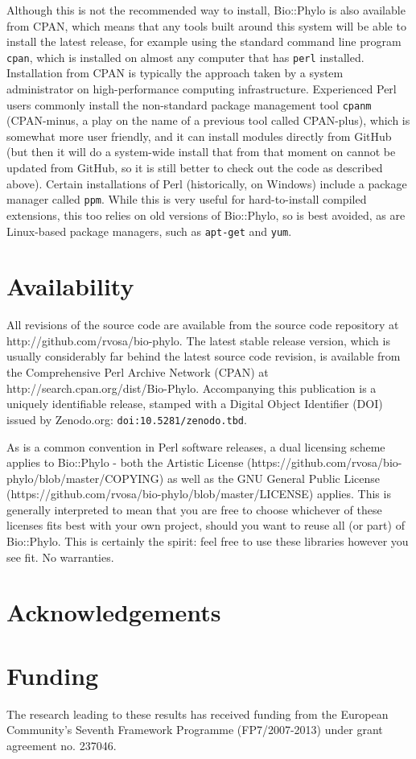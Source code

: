 \documentclass{bioinfo}
\begin{document}
Although this is not the recommended way to install, Bio::Phylo is also available from 
CPAN, which means that any tools built around this system will be able to install the 
latest release, for example using the standard command line program \texttt{cpan}, which 
is installed on almost any computer that has \texttt{perl} installed. Installation from 
CPAN is typically the approach taken by a system administrator on high-performance 
computing infrastructure. Experienced Perl users commonly install the non-standard package 
management tool \texttt{cpanm} (CPAN-minus, a play on the name of a previous tool called 
CPAN-plus), which is somewhat more user friendly, and it can install modules directly from 
GitHub (but then it will do a system-wide install that from that moment on cannot be 
updated from GitHub, so it is still better to check out the code as described above). 
Certain installations of Perl (historically, on Windows) include a package manager called 
\texttt{ppm}. While this is very useful for hard-to-install compiled extensions, this too 
relies on old versions of Bio::Phylo, so is best avoided, as are Linux-based package 
managers, such as \texttt{apt-get} and \texttt{yum}.

\section{Availability}

All revisions of the source code are available from the source code repository at
http://github.com/rvosa/bio-phylo. The latest stable release version, which is usually 
considerably far behind the latest source code revision, is available from the 
Comprehensive Perl Archive Network (CPAN) at http://search.cpan.org/dist/Bio-Phylo. 
Accompanying this publication is a uniquely identifiable release, stamped with a Digital 
Object Identifier (DOI) issued by Zenodo.org: \texttt{doi:10.5281/zenodo.tbd}.

As is a common convention in Perl software releases, a dual licensing scheme applies to
Bio::Phylo - both the Artistic License 
(https://github.com/rvosa/bio-phylo/blob/master/COPYING) as well as the GNU General Public 
License (https://github.com/rvosa/bio-phylo/blob/master/LICENSE) applies. This is 
generally interpreted to mean that you are free to choose whichever of these licenses fits 
best with your own project, should you want to reuse all (or part) of Bio::Phylo. This is 
certainly the spirit: feel free to use these libraries however you see fit. No warranties.

\section*{Acknowledgements}

\section*{Funding}

The research leading to these results has received funding from the European Community's 
Seventh Framework Programme (FP7/2007-2013) under grant agreement no. 237046.




\end{document}
